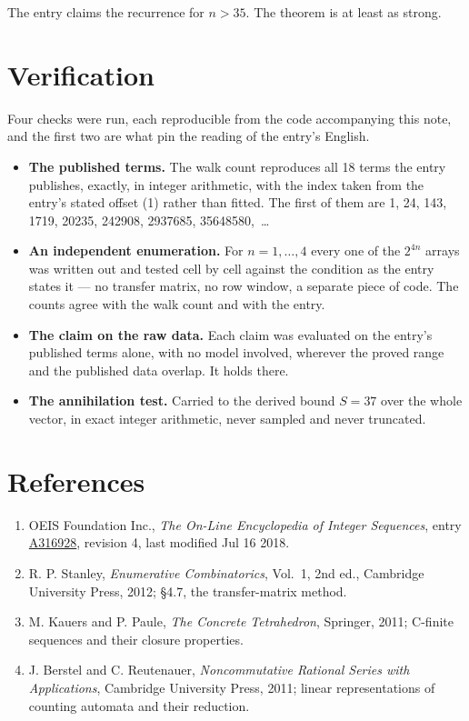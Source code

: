 \documentclass[11pt]{article}
\theoremstyle{definition}
\begin{document}
The entry claims the recurrence for $n > 35$. The theorem is at least as strong.

\section{Verification}

Four checks were run, each reproducible from the code accompanying this note, and the first two are what pin the reading of the entry's English.

\begin{itemize}

\item {\bfseries The published terms.} The walk count reproduces all 18 terms the entry publishes, exactly, in integer arithmetic, with the index taken from the entry's stated offset (1) rather than fitted. The first of them are 1, 24, 143, 1719, 20235, 242908, 2937685, 35648580,~\dots

\item {\bfseries An independent enumeration.} For $n = 1,\dots,4$ every one of the $2^{4n}$ arrays was written out and tested cell by cell against the condition as the entry states it --- no transfer matrix, no row window, a separate piece of code. The counts agree with the walk count and with the entry.

\item {\bfseries The claim on the raw data.} Each claim was evaluated on the entry's published terms alone, with no model involved, wherever the proved range and the published data overlap. It holds there.

\item {\bfseries The annihilation test.} Carried to the derived bound $S = 37$ over the whole vector, in exact integer arithmetic, never sampled and never truncated.

\end{itemize}

\section{References}

\begin{enumerate}

\item OEIS Foundation Inc., \emph{The On-Line Encyclopedia of Integer Sequences}, entry \href{https://oeis.org/A316928}{A316928}, revision 4, last modified Jul 16 2018.

\item R. P. Stanley, \emph{Enumerative Combinatorics}, Vol.~1, 2nd ed., Cambridge University Press, 2012; \S4.7, the transfer-matrix method.

\item M. Kauers and P. Paule, \emph{The Concrete Tetrahedron}, Springer, 2011; C-finite sequences and their closure properties.

\item J. Berstel and C. Reutenauer, \emph{Noncommutative Rational Series with Applications}, Cambridge University Press, 2011; linear representations of counting automata and their reduction.

\end{enumerate}
\end{document}
